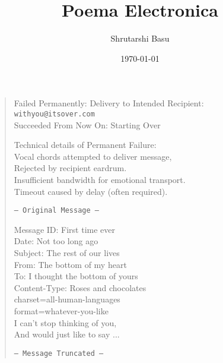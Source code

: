 \documentclass[11pt,letterpaper]{article}
\title{Poema Electronica}
\author{Shrutarshi Basu}
\date{\today}
\begin{document}
\maketitle
\begin{verse}
Failed Permanently: Delivery to Intended Recipient:\\
\texttt{withyou@itsover.com}\\
Succeeded From Now On: Starting Over

Technical details of Permanent Failure:\\
Vocal chords attempted to deliver message,\\
Rejected by recipient eardrum.\\
Insufficient bandwidth for emotional transport.\\
Timeout caused by delay (often required).

\texttt{--- Original Message ---}

Message ID: First time ever\\
Date: Not too long ago\\
Subject: The rest of our lives\\
From: The bottom of my heart\\
To: I thought the bottom of yours\\
Content-Type: Roses and chocolates\\
charset=all-human-languages\\
format=whatever-you-like\\

I can't stop thinking of you,\\
And would just like to say ...

\texttt{--- Message Truncated ---\\}
\end{verse}

\end{document}
